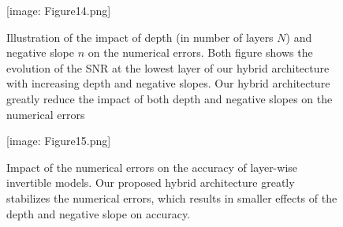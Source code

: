 \documentclass[twocolumn]{bmcart}
\def\texttt{[image: ]}
\begin{document}
\begin{backmatter}
\begin{figure}[t]
\texttt{[image: Figure14.png]}
\caption{
Illustration of the impact of depth (in number of layers $N$) and negative slope $n$ on the numerical errors.
Both figure shows the evolution of the SNR at the lowest layer of our hybrid architecture with increasing depth and negative slopes.
Our hybrid architecture greatly reduce the impact of both depth and negative slopes on the numerical errors
}
\end{figure}

\begin{figure}[t]
\texttt{[image: Figure15.png]}
\caption{
Impact of the numerical errors on the accuracy of layer-wise invertible models.
Our proposed hybrid architecture greatly stabilizes the numerical errors,
which results in smaller effects of the depth and negative slope on accuracy. 
}
\end{figure}

\end{backmatter}
\end{document}
